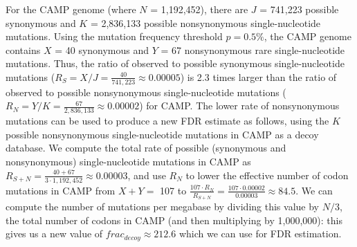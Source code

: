 For the CAMP genome
(where $N$ = 1,192,452),
there are $J$ = 741,223 possible synonymous and
$K$ = 2,836,133 possible nonsynonymous single-nucleotide mutations.
%
Using the mutation frequency threshold $p = 0.5\%$,
the CAMP genome contains
$X$ = 40 synonymous and
$Y$ = 67 nonsynonymous rare single-nucleotide mutations.
%
Thus, the ratio of observed to possible synonymous single-nucleotide mutations
($R_S = X / J = \frac{40}{741,223}
\approx 0.00005$)
is 2.3 times larger than the ratio of observed to possible nonsynonymous single-nucleotide mutations
($R_N = Y / K = \frac{67}{2,836,133}
\approx 0.00002$)
for CAMP.
%
The lower rate of nonsynonymous mutations can be used to produce a new FDR estimate
as follows, using the $K$ possible nonsynonymous single-nucleotide mutations
in CAMP as a decoy database.
%
We compute the total rate of possible (synonymous and nonsynonymous) single-nucleotide mutations
in CAMP as $R_{S + N} =
\frac{40 + 67}{3 \cdot 1,192,452}
\approx 0.00003$, and use $R_N$ to lower the effective number of
codon mutations in CAMP from $X + Y =$ 107 to
$\frac{107 \cdot R_N}{R_{S + N}} =
\frac{107 \cdot 0.00002}{0.00003} \approx 84.5$.
%
We can compute the number of mutations per megabase by dividing this value by $N / 3$,
the total number of codons in CAMP (and then multiplying by 1,000,000):
this gives us a new value of
$frac_{decoy} \approx 212.6$ which we can use for FDR estimation.
\endinput